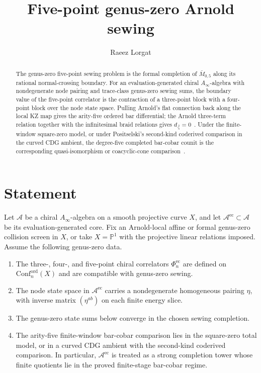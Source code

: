 \documentclass[11pt,reqno]{amsart}
\title{Five-point genus-zero Arnold sewing}
\author{Raeez Lorgat}
\date{}
\theoremstyle{definition}
\theoremstyle{remark}
\newcommand{\cA}{\mathcal{A}}
\newcommand{\Conf}{\mathrm{Conf}}
\newcommand{\Ainf}{A_\infty}
\newcommand{\dbar}{d_{\bar{}}}
\begin{document}
\maketitle

\begin{abstract}
The genus-zero five-point sewing problem is the formal completion of
$\bar M_{0,5}$ along its rational normal-crossing boundary. For an
evaluation-generated chiral $\Ainf$-algebra with nondegenerate node
pairing and trace-class genus-zero sewing sums, the boundary value of
the five-point correlator is the contraction of a three-point block
with a four-point block over the node state space. Pulling Arnold's
flat connection back along the local KZ map gives the arity-five
ordered bar differential; the Arnold three-term relation together
with the infinitesimal braid relations gives
$\dbar_5^2=0$~\cite{Arnold69,Kohno87}. Under the finite-window
square-zero model, or under Positselski's second-kind coderived
comparison in the curved CDG ambient, the degree-five completed
bar-cobar counit is the corresponding quasi-isomorphism or
coacyclic-cone comparison~\cite{LV12,Positselski11}.
\end{abstract}

\section{Statement}
\label{sec:n5-statement}

Let $\cA$ be a chiral $\Ainf$-algebra on a smooth projective curve
$X$, and let $\cA^{\mathrm{ec}}\subset\cA$ be its
evaluation-generated core. Fix an Arnold-local affine or formal
genus-zero collision screen in $X$, or take $X=\mathbb{P}^1$ with
the projective linear relations imposed. Assume the following
genus-zero data.
\begin{enumerate}[label=\textup{(\alph*)}]
\item The three-, four-, and five-point chiral correlators
$\Phi^{\mathrm{ec}}_n$ are defined on
$\Conf_n^{\mathrm{ord}}(X)$ and are compatible with genus-zero
sewing.
\item The node state space in $\cA^{\mathrm{ec}}$ carries a
nondegenerate homogeneous pairing $\eta$, with inverse matrix
$(\eta^{ab})$ on each finite energy slice.
\item The genus-zero state sums below converge in the chosen sewing
completion.
\item The arity-five finite-window bar-cobar comparison lies in the
square-zero total model, or in a curved CDG ambient with the
second-kind coderived comparison. In particular,
$\cA^{\mathrm{ec}}$ is treated as a strong completion tower whose
finite quotients lie in the proved finite-stage bar-cobar regime.
\end{enumerate}
\end{document}
